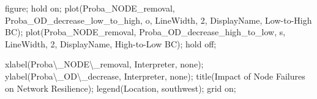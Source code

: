 \documentclass[
  letterpaper,
  DIV=11,
  numbers=noendperiod]{scrartcl}
\newenvironment{Shaded}{\begin{snugshade}}{\end{snugshade}}
\newcommand{\FloatTok}[1]{\textcolor[rgb]{0.68,0.00,0.00}{#1}}
\newcommand{\NormalTok}[1]{\textcolor[rgb]{0.00,0.23,0.31}{#1}}
\newcommand{\OperatorTok}[1]{\textcolor[rgb]{0.37,0.37,0.37}{#1}}
\newcommand{\SpecialStringTok}[1]{\textcolor[rgb]{0.13,0.47,0.30}{#1}}
\newcommand{\VariableTok}[1]{\textcolor[rgb]{0.07,0.07,0.07}{#1}}
\begin{document}
\begin{Shaded}
\begin{Highlighting}[]
\VariableTok{figure}\OperatorTok{;}
\VariableTok{hold} \VariableTok{on}\OperatorTok{;}
\VariableTok{plot}\NormalTok{(}\VariableTok{Proba\_NODE\_removal}\OperatorTok{,} \VariableTok{Proba\_OD\_decrease\_low\_to\_high}\OperatorTok{,} \SpecialStringTok{\textquotesingle{}{-}o\textquotesingle{}}\OperatorTok{,} \SpecialStringTok{\textquotesingle{}LineWidth\textquotesingle{}}\OperatorTok{,} \FloatTok{2}\OperatorTok{,} \SpecialStringTok{\textquotesingle{}DisplayName\textquotesingle{}}\OperatorTok{,} \SpecialStringTok{\textquotesingle{}Low{-}to{-}High BC\textquotesingle{}}\NormalTok{)}\OperatorTok{;}
\VariableTok{plot}\NormalTok{(}\VariableTok{Proba\_NODE\_removal}\OperatorTok{,} \VariableTok{Proba\_OD\_decrease\_high\_to\_low}\OperatorTok{,} \SpecialStringTok{\textquotesingle{}{-}s\textquotesingle{}}\OperatorTok{,} \SpecialStringTok{\textquotesingle{}LineWidth\textquotesingle{}}\OperatorTok{,} \FloatTok{2}\OperatorTok{,} \SpecialStringTok{\textquotesingle{}DisplayName\textquotesingle{}}\OperatorTok{,} \SpecialStringTok{\textquotesingle{}High{-}to{-}Low BC\textquotesingle{}}\NormalTok{)}\OperatorTok{;}
\VariableTok{hold} \VariableTok{off}\OperatorTok{;}

\VariableTok{xlabel}\NormalTok{(}\SpecialStringTok{\textquotesingle{}Proba\textbackslash{}\_NODE\textbackslash{}\_removal\textquotesingle{}}\OperatorTok{,} \SpecialStringTok{\textquotesingle{}Interpreter\textquotesingle{}}\OperatorTok{,} \SpecialStringTok{\textquotesingle{}none\textquotesingle{}}\NormalTok{)}\OperatorTok{;}
\VariableTok{ylabel}\NormalTok{(}\SpecialStringTok{\textquotesingle{}Proba\textbackslash{}\_OD\textbackslash{}\_decrease\textquotesingle{}}\OperatorTok{,} \SpecialStringTok{\textquotesingle{}Interpreter\textquotesingle{}}\OperatorTok{,} \SpecialStringTok{\textquotesingle{}none\textquotesingle{}}\NormalTok{)}\OperatorTok{;}
\VariableTok{title}\NormalTok{(}\SpecialStringTok{\textquotesingle{}Impact of Node Failures on Network Resilience\textquotesingle{}}\NormalTok{)}\OperatorTok{;}
\VariableTok{legend}\NormalTok{(}\SpecialStringTok{\textquotesingle{}Location\textquotesingle{}}\OperatorTok{,} \SpecialStringTok{\textquotesingle{}southwest\textquotesingle{}}\NormalTok{)}\OperatorTok{;}
\VariableTok{grid} \VariableTok{on}\OperatorTok{;}
\end{Highlighting}
\end{Shaded}
\end{document}

